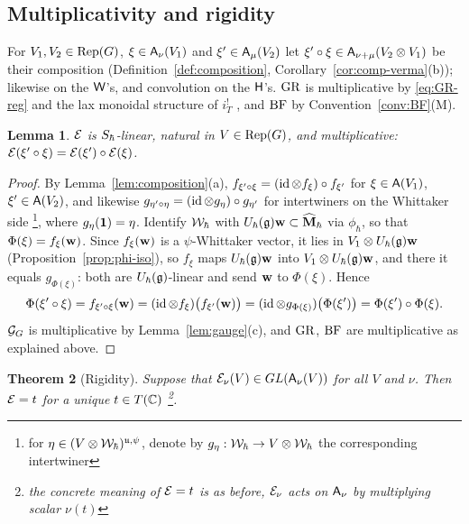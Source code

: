 \documentclass{article}
\theoremstyle{plain}
\newtheorem{theorem}{Theorem}[section]
\newtheorem{lemma}[theorem]{Lemma}
\theoremstyle{definition}
\theoremstyle{remark}
\numberwithin{equation}{section}
\begin{document}
\subsection{Multiplicativity and rigidity}\label{sec:disc-rigid}
For $V_1,V_2\in\operatorname{Rep}(G)$, $\xi\in\mathsf A_\nu(V_1)$ and $\xi'\in\mathsf A_\mu(V_2)$ let $\xi'\circ\xi\in\mathsf A_{\nu+\mu}(V_2\otimes V_1)$ be their composition (Definition~\ref{def:composition}, Corollary~\ref{cor:comp-verma}(b)); likewise on the $\mathsf W$'s, and convolution on the $\mathsf H$'s. $\mathrm{GR}$ is multiplicative by \eqref{eq:GR-reg} and the lax monoidal structure of $i_T^!$ \cite[\S2.2]{macerato2023leviequivariantrestrictionsphericalperverse}, and $\mathrm{BF}$ by Convention~\ref{conv:BF}(M).

\begin{lemma}\label{lem:E-mult}
$\mathcal E$ is $S_\hbar$-linear, natural in $V\in\operatorname{Rep}(G)$, and multiplicative: $\mathcal E(\xi'\circ\xi)=\mathcal E(\xi')\circ\mathcal E(\xi)$.
\end{lemma}

\begin{proof}
By Lemma~\ref{lem:composition}(a), $f_{\xi'\circ\xi}=(\operatorname{id}\otimes f_\xi)\circ f_{\xi'}$ for $\xi\in\mathsf A(V_1)$, $\xi'\in\mathsf A(V_2)$, and likewise $g_{\eta'\circ\eta}=(\operatorname{id}\otimes g_\eta)\circ g_{\eta'}$ for intertwiners on the Whittaker side \footnote{for $\eta \in (V\otimes\mathcal{W}_\hbar)^{\mathfrak{u},\psi}$, denote by $g_\eta : \mathcal{W}_\hbar \to V\otimes \mathcal{W}_\hbar$ the corresponding intertwiner}, where $g_\eta(\mathbf 1)=\eta$. Identify $\mathcal{W}_\hbar$ with $U_\hbar(\mathfrak{g})\mathbf w\subset\widehat{\mathbf M}_\hbar$ via $\phi_\hbar$, so that $\Phi(\xi)=f_\xi(\mathbf w)$. Since $f_\xi(\mathbf w)$ is a $\psi$-Whittaker vector, it lies in $V_1\otimes U_\hbar(\mathfrak{g})\mathbf w$ (Proposition~\ref{prop:phi-iso}), so $f_\xi$ maps $U_\hbar(\mathfrak{g})\mathbf w$ into $V_1\otimes U_\hbar(\mathfrak{g})\mathbf w$, and there it equals $g_{\Phi(\xi)}$: both are $U_\hbar(\mathfrak{g})$-linear and send $\mathbf w$ to $\Phi(\xi)$. Hence
\[
\Phi(\xi'\circ\xi)=f_{\xi'\circ\xi}(\mathbf w)=(\operatorname{id}\otimes f_\xi)\bigl(f_{\xi'}(\mathbf w)\bigr)=(\operatorname{id}\otimes g_{\Phi(\xi)})\bigl(\Phi(\xi')\bigr)=\Phi(\xi')\circ\Phi(\xi).
\]
$\mathcal G_G$ is multiplicative by Lemma~\ref{lem:gauge}(c), and $\mathrm{GR}$, $\mathrm{BF}$ are multiplicative as explained above.
\end{proof}

\begin{theorem}[Rigidity]\label{thm:rigid}
Suppose that $\mathcal E_\nu(V)\in GL(\mathsf A_\nu(V))$ for all $V$ and $\nu$. Then $\mathcal E=t$ for a unique $t\in T(\mathbb{C})$ \footnote{the concrete meaning of $\mathcal E = t$ is as before, $\mathcal E_\nu$ acts on $\mathsf A_\nu$ by multiplying scalar $\nu(t)$}.
\end{theorem}
\end{document}
